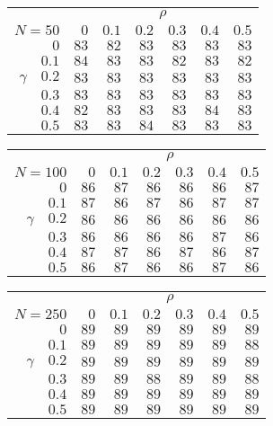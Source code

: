 \begin{tabular}{r|rrrrrr}
\hline\hline
 &\multicolumn{6}{c}{$\rho$} \\ 
 $N = 50$ & $0$ & $0.1$ & $0.2$ & $0.3$ & $0.4$ & $0.5$ \\ 
 \hline$0$ & $83$ & $82$ & $83$ & $83$ & $83$ & $83$\\ 
$0.1$ & $84$ & $83$ & $83$ & $82$ & $83$ & $82$\\ 
$\gamma\quad$$0.2$ & $83$ & $83$ & $83$ & $83$ & $83$ & $83$\\ 
$0.3$ & $83$ & $83$ & $83$ & $83$ & $83$ & $83$\\ 
$0.4$ & $82$ & $83$ & $83$ & $83$ & $84$ & $83$\\ 
$0.5$ & $83$ & $83$ & $84$ & $83$ & $83$ & $83$\\ 
 \hline 
 \end{tabular}
 
 \vspace{2em} 
 
\begin{tabular}{r|rrrrrr}
\hline\hline
 &\multicolumn{6}{c}{$\rho$} \\ 
 $N = 100$ & $0$ & $0.1$ & $0.2$ & $0.3$ & $0.4$ & $0.5$ \\ 
 \hline$0$ & $86$ & $87$ & $86$ & $86$ & $86$ & $87$\\ 
$0.1$ & $87$ & $86$ & $87$ & $86$ & $87$ & $87$\\ 
$\gamma\quad$$0.2$ & $86$ & $86$ & $86$ & $86$ & $86$ & $86$\\ 
$0.3$ & $86$ & $86$ & $86$ & $86$ & $87$ & $86$\\ 
$0.4$ & $87$ & $87$ & $86$ & $87$ & $86$ & $87$\\ 
$0.5$ & $86$ & $87$ & $86$ & $86$ & $87$ & $86$\\ 
 \hline 
 \end{tabular}
 
 \vspace{2em} 
 
\begin{tabular}{r|rrrrrr}
\hline\hline
 &\multicolumn{6}{c}{$\rho$} \\ 
 $N = 250$ & $0$ & $0.1$ & $0.2$ & $0.3$ & $0.4$ & $0.5$ \\ 
 \hline$0$ & $89$ & $89$ & $89$ & $89$ & $89$ & $89$\\ 
$0.1$ & $89$ & $89$ & $89$ & $89$ & $89$ & $88$\\ 
$\gamma\quad$$0.2$ & $89$ & $89$ & $89$ & $89$ & $89$ & $89$\\ 
$0.3$ & $89$ & $89$ & $88$ & $89$ & $89$ & $88$\\ 
$0.4$ & $89$ & $89$ & $89$ & $89$ & $89$ & $89$\\ 
$0.5$ & $89$ & $89$ & $89$ & $89$ & $89$ & $89$\\ 
 \hline 
 \end{tabular}
